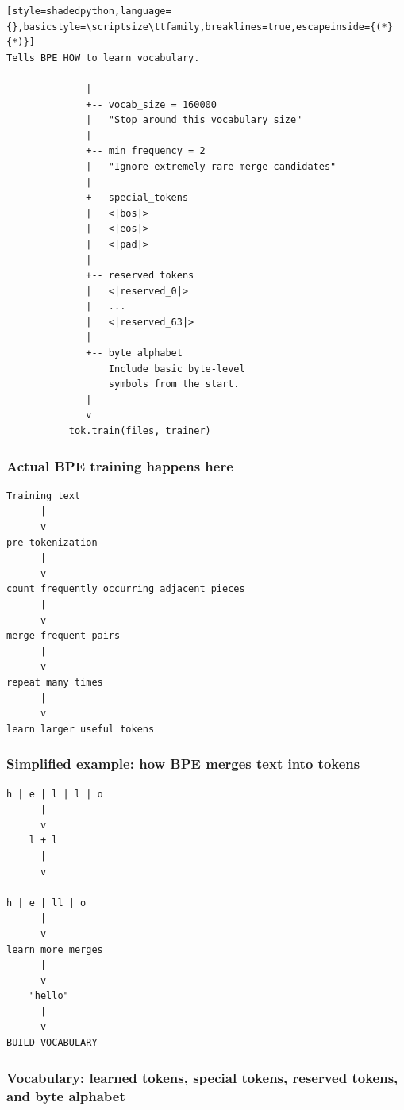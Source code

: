 \begin{lstlisting}[style=shadedpython,language={},basicstyle=\scriptsize\ttfamily,breaklines=true,escapeinside={(*}{*)}]
Tells BPE HOW to learn vocabulary.

              |
              +-- vocab_size = 160000
              |   "Stop around this vocabulary size"
              |
              +-- min_frequency = 2
              |   "Ignore extremely rare merge candidates"
              |
              +-- special_tokens
              |   <|bos|>
              |   <|eos|>
              |   <|pad|>
              |
              +-- reserved tokens
              |   <|reserved_0|>
              |   ...
              |   <|reserved_63|>
              |
              +-- byte alphabet
                  Include basic byte-level
                  symbols from the start.
              |
              v
           tok.train(files, trainer)

\end{lstlisting}

\subsubsection*{Actual BPE training happens here}

\begin{lstlisting}[style=shadedpython,language={},basicstyle=\scriptsize\ttfamily,breaklines=true]
Training text
      |
      v
pre-tokenization
      |
      v
count frequently occurring adjacent pieces
      |
      v
merge frequent pairs
      |
      v
repeat many times
      |
      v
learn larger useful tokens

\end{lstlisting}

\subsubsection*{Simplified example: how BPE merges text into tokens}

\begin{lstlisting}[style=shadedpython,language={},basicstyle=\scriptsize\ttfamily,breaklines=true]
h | e | l | l | o
      |
      v
    l + l
      |
      v

h | e | ll | o
      |
      v
learn more merges
      |
      v
    "hello"
      |
      v
BUILD VOCABULARY

\end{lstlisting}

\subsubsection*{Vocabulary: learned tokens, special tokens, reserved
tokens, and byte alphabet}

